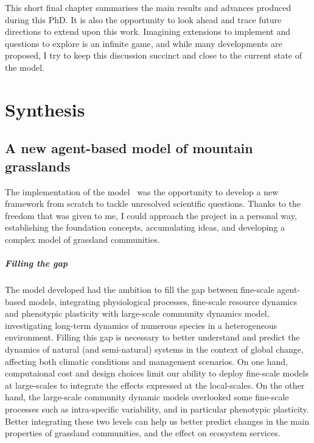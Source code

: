 
\begin{fullwidth}
This short final chapter summarises the main results and advances produced during this PhD. It is also the opportunity to look ahead and trace future directions to extend upon this work. Imagining extensions to implement and questions to explore is an infinite game, and while many developments are proposed, I try to keep this discussion succinct and close to the current state of the model.
\end{fullwidth}

\chapter{Synthesis}
%
%
%
\section{A new agent-based model of mountain grasslands}

The implementation of the model \model ~was the opportunity to develop a new framework from scratch to tackle unresolved scientific questions. Thanks to the freedom that was given to me, I could approach the project in a personal way, establishing the foundation concepts, accumulating ideas, and developing a complex model of grassland communities.

\paragraph{Filling the gap}

The model developed had the ambition to fill the gap between fine-scale agent-based models, integrating physiological processes, fine-scale resource dynamics and phenotypic plasticity with large-scale community dynamics model, investigating long-term dynamics of numerous species in a heterogeneous environment. Filling this gap is necessary to better understand and predict the dynamics of natural (and semi-natural) systems in the context of global change, affecting both climatic conditions and management scenarios. On one hand, computaional cost and design choices limit our ability to deploy fine-scale models at large-scales to integrate the effects expressed at the local-scales. On the other hand, the large-scale community dynamic models overlooked some fine-scale processes such as intra-specific variability, and in particular phenotypic plasticity. Better integrating these two levels can help us better predict changes in the main properties of grassland communities, and the effect on ecosystem services.

